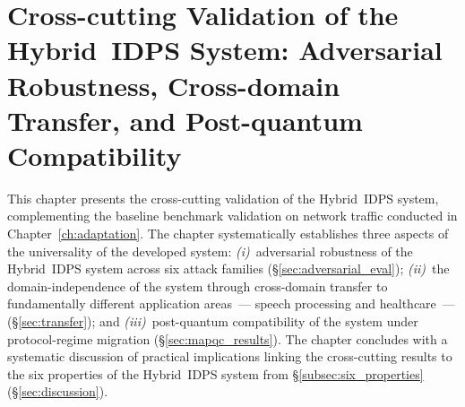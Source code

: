 
\chapter{Cross-cutting Validation of the Hybrid~IDPS System: Adversarial Robustness, Cross-domain Transfer, and Post-quantum Compatibility}
\label{ch:experiments}

This chapter presents the cross-cutting validation of the
Hybrid~IDPS system, complementing the baseline benchmark validation
on network traffic conducted in Chapter~\ref{ch:adaptation}. The
chapter systematically establishes three aspects of the
universality of the developed system: \emph{(i)}~adversarial
robustness of the Hybrid~IDPS system across six attack families
(\S\ref{sec:adversarial_eval}); \emph{(ii)}~the domain-independence
of the system through cross-domain transfer to fundamentally
different application areas~--- speech processing and
healthcare~--- (\S\ref{sec:transfer}); and
\emph{(iii)}~post-quantum compatibility of the system under
protocol-regime migration (\S\ref{sec:mapqc_results}). The chapter
concludes with a systematic discussion of practical implications
linking the cross-cutting results to the six properties of the
Hybrid~IDPS system from \S\ref{subsec:six_properties}
(\S\ref{sec:discussion}).

